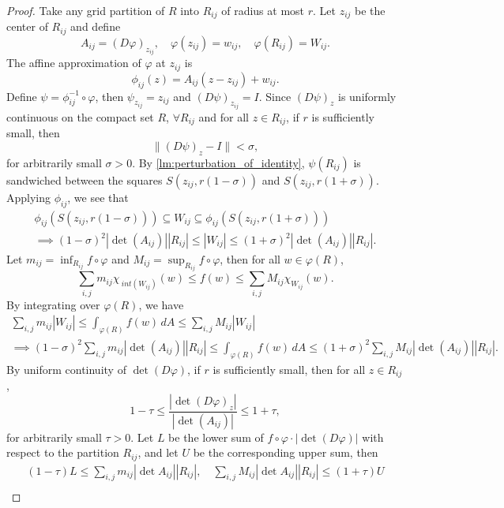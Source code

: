 \begin{thm}
\begin{proof}
        Take any grid partition of $R$ into $R_{ij}$ of radius at most $r$. Let $z_{ij}$ be the center of $R_{ij}$ and define
        \[
        A_{ij} = (D\varphi)_{z_{ij}}, \quad \varphi(z_{ij}) = w_{ij}, \quad \varphi(R_{ij}) = W_{ij}.
        \]
        The affine approximation of $\varphi$ at $z_{ij}$ is
        \[
        \phi_{ij}(z) = A_{ij}(z - z_{ij}) + w_{ij}.
        \]
        Define $\psi = \phi_{ij}^{-1} \circ \varphi$, then $\psi_{z_{ij}} = z_{ij}$ and $(D\psi)_{z_{ij}} = I$. Since $(D\psi)_z$ is uniformly continuous on the compact set $R$, $\forall R_{ij}$ and for all $z \in R_{ij}$, if $r$ is sufficiently small, then
        \[
        \|(D\psi)_z - I\| < \sigma,
        \]
        for arbitrarily small $\sigma > 0$. By \ref{lm:perturbation_of_identity}, $\psi(R_{ij})$ is sandwiched between the squares $S(z_{ij}, r(1 - \sigma))$ and $S(z_{ij}, r(1 + \sigma))$. Applying $\phi_{ij}$, we see that
        \begin{gather*}
            \phi_{ij}(S(z_{ij}, r(1 - \sigma))) \subseteq W_{ij} \subseteq \phi_{ij}(S(z_{ij}, r(1 + \sigma))) \\
            \implies (1 - \sigma)^2 |\det (A_{ij})| |R_{ij}| \leq |W_{ij}| \leq (1 + \sigma)^2 |\det (A_{ij})| |R_{ij}|.
        \end{gather*}
        Let $m_{ij} = \inf_{R_{ij}} f \circ \varphi$ and $M_{ij} = \sup_{R_{ij}} f \circ \varphi$, then for all $w \in \varphi(R)$,
        \[
        \sum_{i, j} m_{ij} \chi_{~int (W_{ij})}(w) \leq f(w) \leq \sum_{i, j} M_{ij} \chi_{W_{ij}}(w).
        \]
        By integrating over $\varphi(R)$, we have
        \begin{gather*}
            \sum_{i, j} m_{ij} |W_{ij}| \leq \int_{\varphi(R)} f(w) \, dA \leq \sum_{i, j} M_{ij} |W_{ij}| \\
            \implies (1 - \sigma)^2 \sum_{i, j} m_{ij} |\det (A_{ij})| |R_{ij}| \leq \int_{\varphi(R)} f(w) \, dA \leq (1 + \sigma)^2 \sum_{i, j} M_{ij} |\det (A_{ij})| |R_{ij}|.
        \end{gather*}
        By uniform continuity of $\det (D\varphi)$, if $r$ is sufficiently small, then for all $z \in R_{ij}$,
        \[
        1 - \tau \leq \frac{|\det (D\varphi)_z|}{|\det (A_{ij})|} \leq 1 + \tau,
        \]
        for arbitrarily small $\tau > 0$. Let $L$ be the lower sum of $f \circ \varphi \cdot |\det (D\varphi)|$ with respect to the partition $R_{ij}$, and let $U$ be the corresponding upper sum, then
        \begin{gather*}
            (1 - \tau) L \leq \sum_{i, j} m_{ij} |\det A_{ij}| |R_{ij}|, \quad \sum_{i, j} M_{ij} |\det A_{ij}| |R_{ij}| \leq (1 + \tau) U \\

\end{gather*}
\end{proof}
\end{thm}
